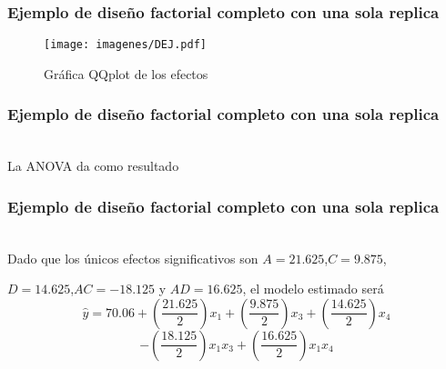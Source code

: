 \documentclass[12pt]{beamer}
\begin{document}
\begin{frame}
\frametitle{Ejemplo de diseño factorial completo con una sola replica}

\begin{figure}[h!]
  \centering
  \texttt{[image: imagenes/DEJ.pdf]}
  \caption{Gráfica QQplot de los efectos}
\end{figure}
\end{frame}

\begin{frame}
\frametitle{Ejemplo de diseño factorial completo con una sola replica}
~\\La ANOVA da como resultado
\begin{table}[H]
  \centering
  \caption{Análisis de varianza una sola réplica}
  \label{tab:addlabel}%
\end{table}%
\end{frame}

\begin{frame}
\frametitle{Ejemplo de diseño factorial completo con una sola replica}
~\\Dado que los únicos efectos significativos son $A=21.625$,$C=9.875$,

$D=14.625$,$AC=-18.125$ y $AD=16.625$, el modelo estimado será
$$\hat{y}=70.06+\left(\frac{21.625}{2}\right)x_1+\left(\frac{9.875}{2}\right)x_3+\left(\frac{14.625}{2}\right)x_4$$
$$-\left(\frac{18.125}{2}\right)x_1x_3+\left(\frac{16.625}{2}\right)x_1x_4$$
\end{frame}
\end{document}
